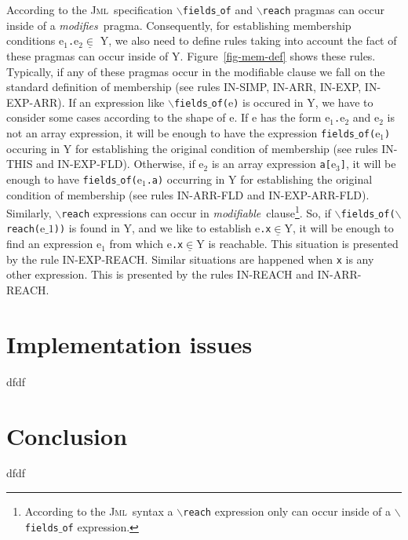 \documentclass[a4paper]{llncs}
\newcommand{\jml}{\textsc{Jml}}
\newcommand{\modif}{\textit{modifiable}}
\newcommand{\modifies}{\textit{modifies}}
\begin{document}
According to the \jml~specification
\texttt{$\backslash$fields}$\_$\texttt{of} and
\texttt{$\backslash$reach} pragmas can occur inside of a
\modifies~pragma. Consequently, for establishing membership conditions
\textup{e}$_1$\texttt{.}\textup{e}$_2$$\underline\in$ \textsc{Y}, we
also need
to define rules taking into account the fact of these pragmas can
occur inside of \textsc{Y}. Figure~\ref{fig-mem-def} shows these
rules. Typically, if any of these pragmas occur in the modifiable
clause we fall on the standard definition of membership (see rules
\textup{IN-SIMP},  \textup{IN-ARR}, \textup{IN-EXP},
\textup{IN-EXP-ARR}). If an expression
like
$\backslash$\texttt{fields}$\_$\texttt{of(}\textup{e}\texttt{)} is
occured in \textsc{Y}, we
have to consider some cases according to the shape of \textup{e}. If
\textup{e} has the form \textup{e}$_1$\texttt{.}\textup{e}$_2$ and
\textup{e}$_2$ is not an array expression, it will be enough to have
the expression \texttt{fields$\_$of(}\textup{e}$_1$\texttt{)} occuring 
in \textsc{Y} for 
establishing the original condition of membership (see rules
\textup{IN-THIS} and \textup{IN-EXP-FLD}). Otherwise, if
\textup{e}$_2$ is an array expression
\texttt{a[}\textup{e}$_3$\texttt{]}, 
it will be enough to have
\texttt{fields$\_$of(}\textup{e}$_1$\texttt{.a}\texttt{)} occurring in
\textsc{Y} for establishing the original condition of membership
(see rules \textup{IN-ARR-FLD} and
\textup{IN-EXP-ARR-FLD}). Similarly, $\backslash$\texttt{reach}
expressions can occur in \modif~clause\footnote{According to the
\jml~syntax a
$\backslash$\texttt{reach} expression only can occur inside of a
$\backslash$\texttt{fields}$\_$\texttt{of} expression.}. So, if
$\backslash$\texttt{fields}$\_$\texttt{of($\backslash$reach(}\textup{e}$\_1$\texttt{))}
is found in \textsc{Y}, and we like to establish
\textup{e}\texttt{.x}$\underline\in$\textsc{Y}, it will be enough to
find an expression \textup{e}$_1$ from which
\textup{e}\texttt{.x}$\underline\in$\textsc{Y} is reachable. This
situation is
presented by the rule \textup{IN-EXP-REACH}. Similar situations are
happened when \texttt{x} is any other expression. This is presented by
the rules \textup{IN-REACH} and \textup{IN-ARR-REACH}.


\section{Implementation issues}
\label{sec-imp-iss}
dfdf
\section{Conclusion}
\label{sec-con}
dfdf


\end{document}
